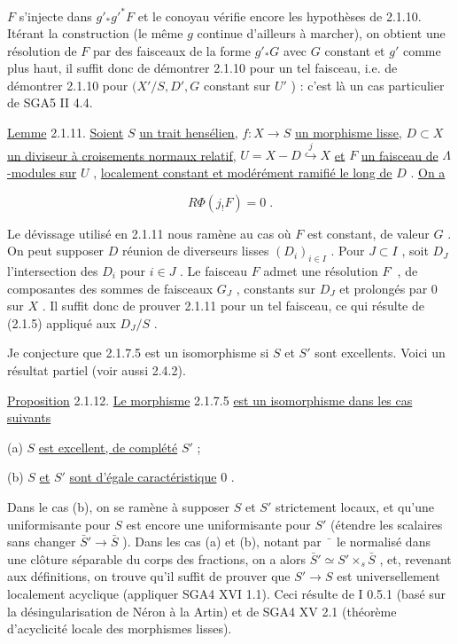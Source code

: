 $F$ s'injecte dans $g'_* g'^* F$ et le conoyau vérifie encore les hypothèses de 2.1.10. Itérant la construction (le même $g$ continue d'ailleurs à marcher), on obtient une résolution de $F$ par des faisceaux de la forme $g'_* G$ avec $G$ constant et $g'$ comme plus haut, il suffit donc de démontrer 2.1.10 pour un tel faisceau, i.e. de démontrer 2.1.10 pour $(X'/S, D', G$ constant sur $U'$ ) : c'est là un cas particulier de SGA5 II 4.4.

\underline{Lemme} 2.1.11. \underline{Soient} $S$ \underline{un trait hensélien,} $f : X \to S$ \underline{un morphisme lisse,} $D \subset X$ \underline{un diviseur à croisements normaux relatif,} $U = X - D \stackrel{j}{\hookrightarrow} X$ \underline{et} $F$ \underline{un faisceau de} $\Lambda$\underline{-modules sur} $U$ , \underline{localement constant et modérément ramifié le long de} $D$ . \underline{On a}

\begin{equation*}
R\Phi(j_! F) = 0 \;.
\end{equation*}


Le dévissage utilisé en 2.1.11 nous ramène au cas où $F$ est constant, de valeur $G$ . On peut supposer $D$ réunion de diverseurs lisses $(D_i)_{i \in I}$ . Pour $J \subset I$ , soit $D_J$ l'intersection des $D_i$ pour $i \in J$ . Le faisceau $F$ admet une résolution $F^{\cdot}$ , de composantes des sommes de faisceaux $G_J$ , constants sur $D_J$ et prolongés par $0$ sur $X$ . Il suffit donc de prouver 2.1.11 pour un tel faisceau, ce qui résulte de (2.1.5) appliqué aux $D_J/S$ .

Je conjecture que 2.1.7.5 est un isomorphisme si $S$ et $S'$ sont excellents. Voici un résultat partiel (voir aussi 2.4.2).

\underline{Proposition} 2.1.12. \underline{Le morphisme} 2.1.7.5 \underline{est un isomorphisme dans les cas suivants}

(a) $S$ \underline{est excellent, de complété} $S'$ ;

(b) $S$ \underline{et} $S'$ \underline{sont d'égale caractéristique} $0$ .

Dans le cas (b), on se ramène à supposer $S$ et $S'$ strictement locaux, et qu'une uniformisante pour $S$ est encore une uniformisante pour $S'$ (étendre les scalaires sans changer $\bar{S}' \to \bar{S}$ ). Dans les cas (a) et (b), notant par $\bar{\phantom{x}}$ le normalisé dans une clôture séparable du corps des fractions, on a alors $\bar{S}' \simeq S' \times_s \bar{S}$ , et, revenant aux définitions, on trouve qu'il suffit de prouver que $S' \to S$ est universellement localement acyclique (appliquer SGA4 XVI 1.1). Ceci résulte de I 0.5.1 (basé sur la désingularisation de Néron à la Artin) et de SGA4 XV 2.1 (théorème d'acyclicité locale des morphismes lisses).

